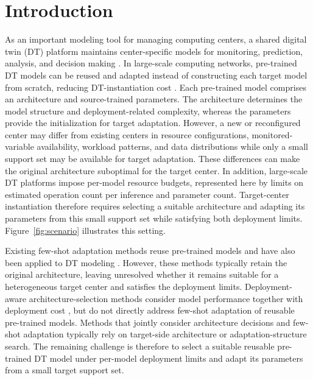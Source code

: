 \documentclass[a4paper,fleqn]{cas-sc}
\begin{document}
\maketitle


\section{Introduction}
\label{sec:introduction}

As an important modeling tool for managing computing centers, a shared digital
twin (DT) platform maintains center-specific models for monitoring, prediction,
analysis, and decision making \cite{ref1,ref2,ref3,ref4}. In large-scale computing
networks, pre-trained DT models can be reused and adapted instead of
constructing each target model from scratch, reducing DT-instantiation cost
\cite{ref8,ref11}. Each pre-trained model comprises an architecture and
source-trained parameters. The architecture determines the model structure and
deployment-related complexity, whereas the parameters provide the
initialization for target adaptation. However, a new or reconfigured center
may differ from existing centers in resource configurations,
monitored-variable availability, workload patterns, and data distributions
while only a small support set may be available for target adaptation. These differences can make
the original architecture suboptimal for the target center. In addition,
large-scale DT platforms impose per-model resource budgets, represented here
by limits on estimated operation count per inference and parameter count.
Target-center instantiation therefore requires selecting a suitable
architecture and adapting its parameters from this small support set while
satisfying both deployment limits. Figure~\ref{fig:scenario} illustrates this setting.

Existing few-shot adaptation methods reuse pre-trained models
\cite{ref9,ref10} and have also been applied to DT modeling \cite{ref11}.
However, these methods typically retain the original architecture, leaving
unresolved whether it remains suitable for a heterogeneous target center and
satisfies the deployment limits. Deployment-aware architecture-selection
methods consider model performance together with deployment cost
\cite{ref12,ref13,ref26}, but do not directly address few-shot adaptation of
reusable pre-trained models. Methods that jointly consider architecture
decisions and few-shot adaptation \cite{ref30,ref31,ref32} typically rely on
target-side architecture or adaptation-structure search. The remaining
challenge is therefore to select a suitable reusable pre-trained DT model under
per-model deployment limits and adapt its parameters from a small target
support set.
\end{document}
